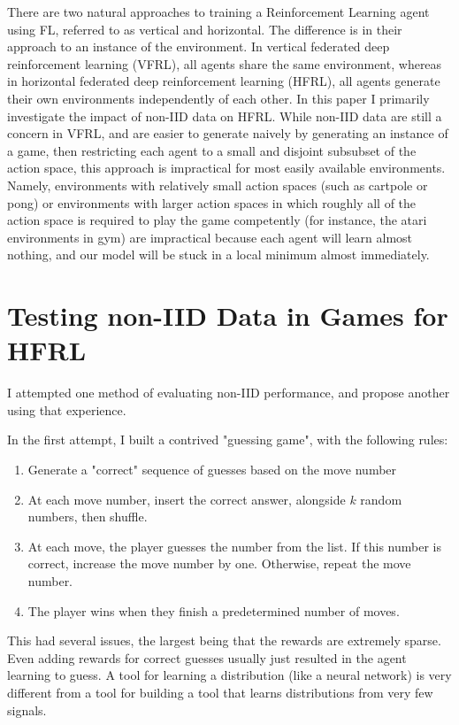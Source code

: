 \documentclass[10pt,journal]{IEEEtran}
\begin{document}
There are two natural approaches to training a Reinforcement Learning agent using FL, referred to as
vertical and horizontal. The difference is in their approach to an instance of the environment. In vertical
federated deep reinforcement learning (VFRL), all agents share the same environment\cite{qi_federated_2021}, whereas
in horizontal federated deep reinforcement learning (HFRL), all agents generate their own environments
independently of each other. In this paper I primarily investigate the impact of non-IID data on HFRL. While
non-IID data are still a concern in VFRL, and are easier to generate naively by generating an instance
of a game, then restricting each agent to a small and disjoint subsubset of the action space, this approach
is impractical for most easily available environments. Namely, environments with relatively small action spaces
(such as cartpole or pong) or environments with larger action spaces in which roughly all of the action
space is required to play the game competently (for instance, the atari environments in gym\cite{noauthor_openaigym_2022}) are
impractical because each agent will learn almost nothing, and our model will be stuck in a local minimum almost
immediately.

\section{Testing non-IID Data in Games for HFRL}

I attempted one method of evaluating non-IID performance, and propose another using that experience.

In the first attempt, I built a contrived "guessing game", with the following rules:

\begin{enumerate}
  \item Generate a "correct" sequence of guesses based on the move number
  \item At each move number, insert the correct answer, alongside $k$ random numbers, then shuffle.
  \item At each move, the player guesses the number from the list. If this number is correct, increase
        the move number by one. Otherwise, repeat the move number.
  \item The player wins when they finish a predetermined number of moves.
\end{enumerate}

This had several issues, the largest being that the rewards are extremely sparse. Even adding rewards
for correct guesses usually just resulted in the agent learning to guess. A tool for learning a distribution
(like a neural network) is very different from a tool for building a tool that learns distributions from very
few signals.
\end{document}
